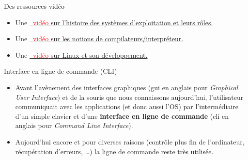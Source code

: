\documentclass[10pt]{beamer}
\begin{document}
\begin{frame}
	\mframe{\Systeme}
	\begin{block}{Des ressources vidéo}
		\begin{itemize}
		\item<1->{Une  \href{https://youtu.be/4OhUDAtmAUo}{\textcolor{red}{\faYoutube \ vidéo} sur l'histoire des systèmes d'exploitation et leurs rôles.}}
		\item<2->{Une  \href{https://youtu.be/4lXp_89c3RU}{\textcolor{red}{\faYoutube \ vidéo} sur les notions de compilateurs/interpréteur.}}
		\item<3->{Une  \href{https://youtu.be/yVpbFMhOAwE}{\textcolor{red}{\faYoutube \ vidéo} sur Linux et son développement.}}
		\end{itemize}
	\end{block}
\end{frame}


\begin{frame}
	\mframe{\Systeme}
	\begin{block}{Interface en ligne de commande (CLI)}
		\begin{itemize}
			\item<1-> Avant l'avènement des interfaces graphiques ({\sc gui} en anglais pour \textit{Graphical User Interface}) et de la souris que nous connaissons aujourd'hui, l'utilisateur communiquait avec les applications (et donc aussi l'OS) par l'intermédiaire d'un simple clavier et d'une \textbf{interface en ligne de commande} ({\sc cli} en anglais pour \textit{Command Line Interface}).
			\item<2-> Aujourd'hui encore et pour diverses raisons (contrôle plus fin de l'ordinateur, récupération d'erreurs, \dots) la ligne de commande reste très utilisée.
		\end{itemize}
	\end{block}
\end{frame}
\end{document}
